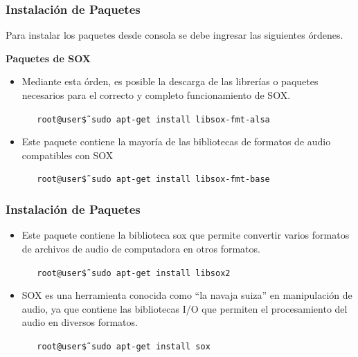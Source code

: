 \begin{frame}
\frametitle{Instalación de Paquetes}

Para instalar los paquetes desde consola se debe ingresar las siguientes órdenes.

\textbf{Paquetes de SOX}
\begin{itemize}
 
    \item { Mediante esta órden, es posible la descarga de las librerías o paquetes necesarios para el correcto y completo funcionamiento de SOX.
    \begin{block}{}
    \texttt
    {\ \ \ root@user\~\$ sudo apt-get install libsox-fmt-alsa}
    \end{block}}
    
    \item{Este paquete contiene la mayoría de las bibliotecas de formatos de audio compatibles con SOX
    \begin{block}{}
    \texttt
    {\ \ \ root@user\~\$ sudo apt-get install libsox-fmt-base}
    \end{block}}
\end{itemize}

\end{frame}

\begin{frame}
\frametitle{Instalación de Paquetes}

\begin{itemize}
    \item {Este paquete contiene la biblioteca sox que permite convertir varios formatos de archivos de audio de computadora en otros formatos.
    \begin{block}{}
    \texttt
    {\ \ \ root@user\~\$ sudo apt-get install libsox2}
    \end{block}}
    
    \item{SOX es una herramienta conocida como “la navaja suiza” en manipulación de audio, ya que contiene las bibliotecas I/O que permiten el procesamiento del audio en diversos formatos.
    \begin{block}{}
    \texttt
    {\ \ \ root@user\~\$ sudo apt-get install sox}
    \end{block}}
\end{itemize}

\end{frame}


